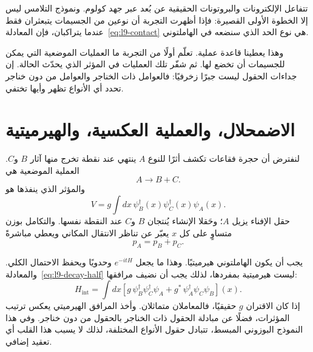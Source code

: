 تتفاعل الإلكترونات والبروتونات الحقيقية عن بُعد عبر جهد كولوم. ونموذج التلامس ليس إلا الخطوة الأولى القصيرة: فإذا أظهرت التجربة أن نوعين من الجسيمات يتبعثران فقط عندما يتراكبان، فإن المعادلة~\eqref{eq:l9-contact} هي نوع الحد الذي سنضعه في الهاملتوني.

\begin{classroomqa}
\end{classroomqa}

وهذا يعطينا قاعدة عملية. تعلّم أولًا من التجربة ما العمليات الموضعية التي يمكن للجسيمات أن تخضع لها. ثم شفّر تلك العمليات في المؤثر الذي يحدّث الحالة. إن جداءات الحقول ليست جبرًا زخرفيًا: فالعوامل ذات الخناجر والعوامل من دون خناجر تحدد أي الأنواع تظهر وأيها تختفي.

\section{الاضمحلال، والعملية العكسية، والهيرميتية}

لنفترض أن حجرة فقاعات تكشف أثرًا للنوع \(A\) ينتهي عند نقطة تخرج منها آثار \(B\) و\(C\). العملية الموضعية هي
\begin{equation}
A\longrightarrow B+C.
\end{equation}
والمؤثر الذي ينفذها هو
\begin{equation}
V=g\int dx\,
\psi_B^\dagger(x)\psi_C^\dagger(x)\psi_A(x).
\label{eq:l9-decay-half}
\end{equation}
حقل الإفناء يزيل \(A\)؛ وحَقلا الإنشاء يُنتجان \(B\) و\(C\) عند النقطة نفسها. والتكامل بوزن متساوٍ على كل \(x\) يعبّر عن تناظر الانتقال المكاني ويعطي مباشرةً
\begin{equation}
p_A=p_B+p_C.
\end{equation}

يجب أن يكون الهاملتوني هيرميتيًا. وهذا ما يجعل \(e^{-itH}\) وحدويًا ويحفظ الاحتمال الكلي. والمعادلة~\eqref{eq:l9-decay-half} ليست هيرميتية بمفردها، لذلك يجب أن نضيف مرافقها:
\begin{equation}
H_{\mathrm{int}}
=\int dx\left[
g\,\psi_B^\dagger\psi_C^\dagger\psi_A
+g^*\,\psi_A^\dagger\psi_C\psi_B
\right](x).
\label{eq:l9-hermitian-vertex}
\end{equation}
إذا كان الاقتران \(g\) حقيقيًا، فالمعاملان متماثلان. وأخذ المرافق الهيرميتي يعكس ترتيب المؤثرات، فضلًا عن مبادلة الحقول ذات الخناجر بالحقول من دون خناجر. وفي هذا النموذج البوزوني المبسط، تتبادل حقول الأنواع المختلفة، لذلك لا يسبب هذا القلب أي تعقيد إضافي.

